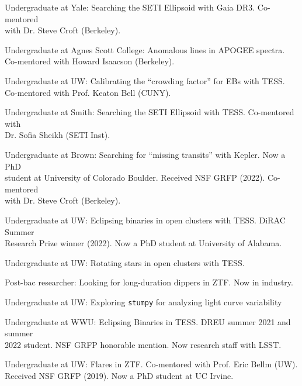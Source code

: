 Undergraduate at Yale: Searching the SETI Ellipsoid with Gaia DR3. Co-mentored \\with Dr. Steve Croft (Berkeley).


Undergraduate at Agnes Scott College: Anomalous lines in APOGEE spectra.\\ Co-mentored with Howard Isaacson (Berkeley).


Undergraduate at UW: Calibrating the ``crowding factor'' for EBs with TESS. \\Co-mentored with Prof. Keaton Bell (CUNY).

Undergraduate at Smith: Searching the SETI Ellipsoid with TESS. Co-mentored with \\Dr. Sofia Sheikh (SETI Inst).


Undergraduate at Brown: Searching for ``missing transits'' with Kepler. Now a PhD \\student at University of Colorado Boulder. Received NSF GRFP (2022). Co-mentored \\with Dr. Steve Croft (Berkeley).


Undergraduate at UW: Eclipsing binaries in open clusters with TESS. DiRAC Summer \\Research Prize winner (2022). Now a PhD student at University of Alabama.


Undergraduate at UW: Rotating stars in open clusters with TESS.

Post-bac researcher: Looking for long-duration dippers in ZTF. Now in industry.


Undergraduate at UW: Exploring {\tt stumpy} for analyzing light curve variability


Undergraduate at WWU: Eclipsing Binaries in TESS. DREU summer 2021 and summer \\2022 student. NSF GRFP honorable mention. Now research staff with LSST.


Undergraduate at UW: Flares in ZTF. Co-mentored with Prof. Eric Bellm (UW). \\Received NSF GRFP (2019). Now a PhD student at UC Irvine.


